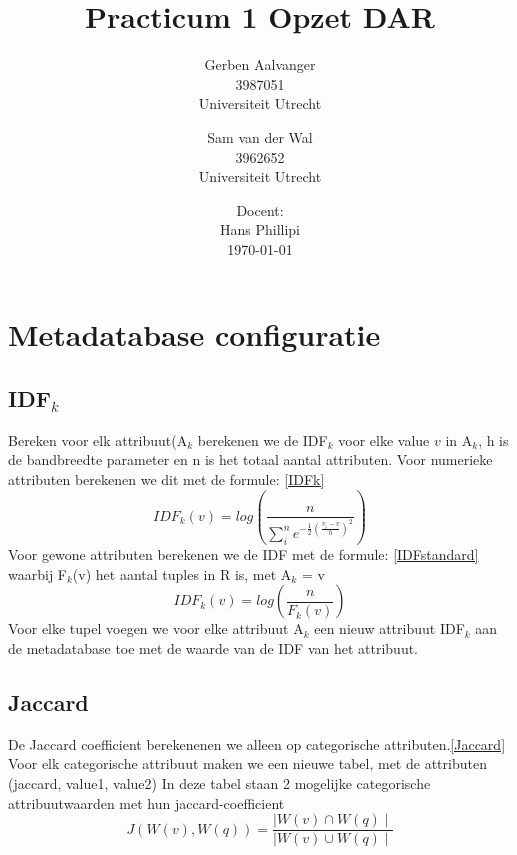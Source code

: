 \documentclass[a4paper]{article}
\begin{document}
\title{Practicum 1 Opzet DAR}
\author{Gerben Aalvanger\\ 
         3987051 \\
        Universiteit Utrecht
		\and
		Sam van der Wal\\ 
         3962652 \\
        Universiteit Utrecht
        }
\date{Docent: \\ 
Hans Phillipi \\
\today}
\maketitle

\section{Metadatabase configuratie}
\subsection{IDF$_k$}
Bereken voor elk attribuut(A$_k$ berekenen we de IDF$_k$ voor elke value $v$ in A$_k$, h is de bandbreedte parameter en n is het totaal aantal attributen. 
Voor numerieke attributen berekenen we dit met de formule: \eqref{IDFk}
\begin{equation}
IDF_k (v) = log(\frac{n}{\sum_{i}^{n}e^{-\frac{1}{2}(\frac{v_ i -v}{h})^2}})
\label{IDFk}
\end{equation}
Voor gewone attributen berekenen we de IDF met de formule: \eqref{IDFstandard} waarbij F$_k$(v) het aantal tuples in R is, met A$_k$ = v
\begin{equation}
IDF_k (v) = log(\frac{n}{F_k(v)})
\label{IDFstandard}
\end{equation}
Voor elke tupel voegen we voor elke attribuut A$_k$ een nieuw attribuut IDF$_k$ aan de metadatabase toe met de waarde van de IDF van het attribuut.
\subsection{Jaccard}
De Jaccard coefficient berekenenen we alleen op categorische attributen.\eqref{Jaccard}
Voor elk categorische attribuut maken we een nieuwe tabel, met de attributen (jaccard, value1, value2)
In deze tabel staan 2 mogelijke categorische attribuutwaarden met hun jaccard-coefficient
\begin{equation}
J(W(v), W(q)) = \frac{\mid W(v)\cap W(q)\mid}{\mid W(v)\cup W(q)\mid}
\label{Jaccard}
\end{equation}
\end{document}
